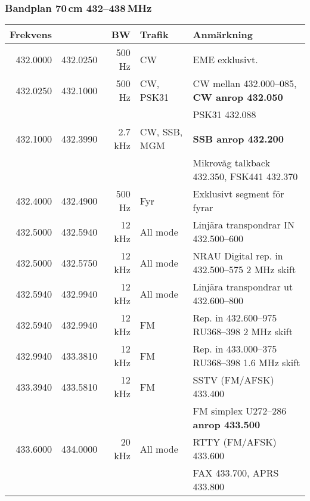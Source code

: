 \subsubsection{Bandplan 70\,cm 432--438\,MHz}
\begin{tabular}{rrrll}
	\textbf{Frekvens} &          & \textbf{BW} & \textbf{Trafik} & \textbf{Anmärkning}                               \\ \hline
	
	432.0000 & 432.0250 & 500 Hz  & CW           & EME exklusivt.                                    \\ \hline
	432.0250 & 432.1000 & 500 Hz  & CW, PSK31    & CW mellan 432.000--085, \textbf{CW anrop 432.050} \\
	&          &         &              & PSK31 432.088                                     \\ \hline
	432.1000 & 432.3990 & 2.7 kHz & CW, SSB, MGM & \textbf{SSB anrop 432.200}                        \\
	&          &         &              & Mikrovåg talkback 432.350, FSK441 432.370         \\ \hline
	432.4000 & 432.4900 & 500 Hz  & Fyr          & Exklusivt segment för fyrar                       \\ \hline
	432.5000 & 432.5940 & 12 kHz  & All mode     & Linjära transpondrar IN 432.500--600              \\ \hline
	432.5000 & 432.5750 & 12 kHz  & All mode     & NRAU Digital rep. in 432.500--575 2 MHz skift     \\ \hline
	432.5940 & 432.9940 & 12 kHz  & All mode     & Linjära transpondrar ut 432.600--800              \\ \hline
	432.5940 & 432.9940 & 12 kHz  & FM           & Rep. in 432.600--975 RU368--398 2 MHz skift       \\ \hline
	432.9940 & 433.3810 & 12 kHz  & FM           & Rep. in 433.000--375 RU368--398 1.6 MHz skift     \\ \hline
	433.3940 & 433.5810 & 12 kHz  & FM           & SSTV (FM/AFSK) 433.400                            \\
	&          &         &              & FM simplex U272--286 \textbf{anrop 433.500}       \\ \hline
	433.6000 & 434.0000 & 20 kHz  & All mode     & RTTY (FM/AFSK) 433.600                            \\
	&          &         &              & FAX 433.700, APRS 433.800                         \\ \hline

\end{tabular}
